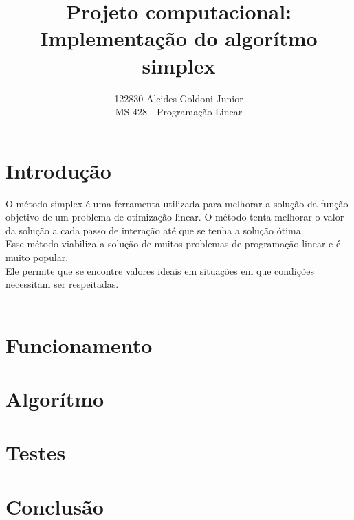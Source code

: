 \documentclass[a4paper]{article}
\title{Projeto computacional: Implementa\c{c}\~ao do algor\'itmo simplex}
\author{122830 Alcides Goldoni Junior\\
	\small MS 428 - Programa\c{c}\~ao Linear\\
	}%
\begin{document}
\maketitle
\section{Introdu\c{c}\~ao}
O m\'etodo simplex \'e uma ferramenta utilizada para melhorar a solu\c{c}\~ao da fun\c{c}\~ao objetivo de um problema de otimiza\c{c}\~ao linear. O m\'etodo tenta melhorar o valor da solu\c{c}\~ao a cada passo de intera\c{c}\~ao at\'e que se tenha a solu\c{c}\~ao \'otima.\\
Esse m\'etodo viabiliza a solu\c{c}\~ao de muitos problemas de programa\c{c}\~ao linear e \'e muito popular.\\
Ele permite que se encontre valores ideais em situa\c{c}\~oes em que condi\c{c}\~oes necessitam ser respeitadas.\\
\\
\section{Funcionamento}
\section{Algor\'itmo}
\section{Testes}
\section{Conclus\~ao}
\end{document}

